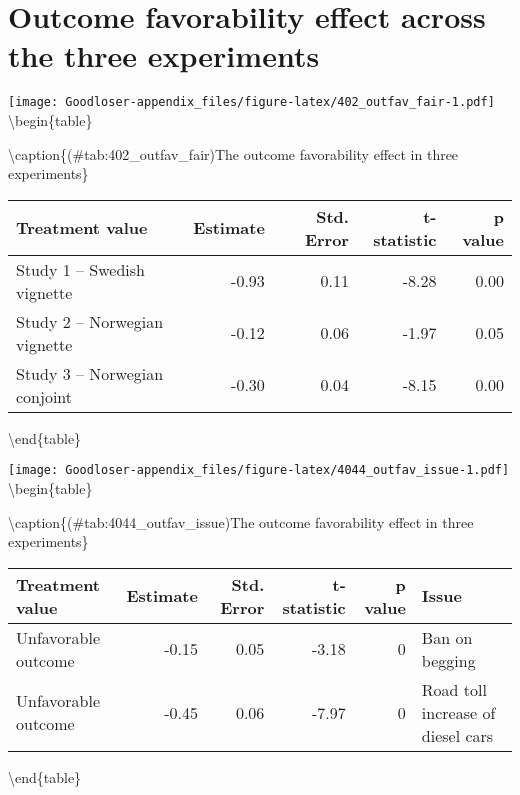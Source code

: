 \documentclass[
]{book}
\begin{document}
\hypertarget{outcome-favorability-effect-across-the-three-experiments}{%
\chapter{Outcome favorability effect across the three experiments}\label{outcome-favorability-effect-across-the-three-experiments}}

\texttt{[image: Goodloser-appendix\_files/figure-latex/402\_outfav\_fair-1.pdf]} \textbackslash begin\{table\}

\textbackslash caption\{(\#tab:402\_outfav\_fair)The outcome favorability effect in three experiments\}
\centering

\begin{tabular}[t]{lrrrr}
\toprule
Treatment value & Estimate & Std. Error & t-statistic & p value\\
\midrule
Study 1 -- Swedish vignette & -0.93 & 0.11 & -8.28 & 0.00\\
Study 2 -- Norwegian vignette & -0.12 & 0.06 & -1.97 & 0.05\\
Study 3 -- Norwegian conjoint & -0.30 & 0.04 & -8.15 & 0.00\\
\bottomrule
\end{tabular}

\textbackslash end\{table\}

\texttt{[image: Goodloser-appendix\_files/figure-latex/4044\_outfav\_issue-1.pdf]} \textbackslash begin\{table\}

\textbackslash caption\{(\#tab:4044\_outfav\_issue)The outcome favorability effect in three experiments\}
\centering

\begin{tabular}[t]{lrrrrl}
\toprule
Treatment value & Estimate & Std. Error & t-statistic & p value & Issue\\
\midrule
Unfavorable outcome & -0.15 & 0.05 & -3.18 & 0 & Ban on begging\\
Unfavorable outcome & -0.45 & 0.06 & -7.97 & 0 & Road toll increase of diesel cars\\
\bottomrule
\end{tabular}

\textbackslash end\{table\}

  
\end{document}
